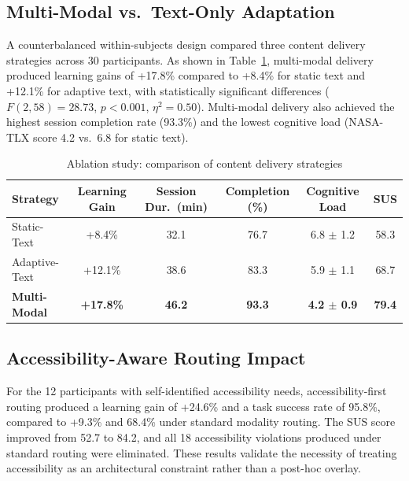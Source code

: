 \subsection{Multi-Modal vs.\ Text-Only Adaptation}

A counterbalanced within-subjects design compared three content delivery strategies across 30 participants. As shown in Table~\ref{tab:ablation_modal}, multi-modal delivery produced learning gains of +17.8\% compared to +8.4\% for static text and +12.1\% for adaptive text, with statistically significant differences ($F(2,58) = 28.73$, $p < 0.001$, $\eta^2 = 0.50$). Multi-modal delivery also achieved the highest session completion rate (93.3\%) and the lowest cognitive load (NASA-TLX score 4.2 vs.\ 6.8 for static text).

\begin{table}[htb]
	\fontsize{10}{12}\selectfont
	\centering
	\caption{Ablation study: comparison of content delivery strategies}
	\label{tab:ablation_modal}
	\begin{tabular}{|l|c|c|c|c|c|}
		\hline
		\textbf{Strategy} & \textbf{Learning Gain} & \textbf{Session Dur.\ (min)} & \textbf{Completion (\%)} & \textbf{Cognitive Load} & \textbf{SUS} \\
		\hline
		Static-Text    & +8.4\%  & 32.1 & 76.7 & 6.8 $\pm$ 1.2 & 58.3 \\
		\hline
		Adaptive-Text  & +12.1\% & 38.6 & 83.3 & 5.9 $\pm$ 1.1 & 68.7 \\
		\hline
		\textbf{Multi-Modal} & \textbf{+17.8\%} & \textbf{46.2} & \textbf{93.3} & \textbf{4.2 $\pm$ 0.9} & \textbf{79.4} \\
		\hline
	\end{tabular}
\end{table}

\subsection{Accessibility-Aware Routing Impact}

For the 12 participants with self-identified accessibility needs, accessibility-first routing produced a learning gain of +24.6\% and a task success rate of 95.8\%, compared to +9.3\% and 68.4\% under standard modality routing. The SUS score improved from 52.7 to 84.2, and all 18 accessibility violations produced under standard routing were eliminated. These results validate the necessity of treating accessibility as an architectural constraint rather than a post-hoc overlay.

